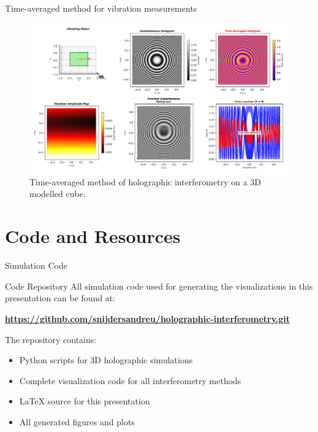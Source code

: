 \documentclass{beamer}
\begin{document}
\begin{frame}{Time-averaged method for vibration measurements}
    \begin{figure}[h]
        \centering
        \includegraphics[width=1\textwidth]{Figures/cube-vibration.png}
        \caption{Time-averaged method of holographic interferometry on a 3D modelled cube.}
        \label{fig:vibration_holography}
    \end{figure}
\end{frame}

\section{Code and Resources}
\begin{frame}{Simulation Code}
    \begin{alertblock}{Code Repository}
        All simulation code used for generating the visualizations in this presentation can be found at:
        
        \vspace{0.5em}
        
        \centering
        \textbf{\url{https://github.com/snijdersandreu/holographic-interferometry.git}}
        
        \vspace{0.5em}
        
        \raggedright
        The repository contains:
        \begin{itemize}
            \item Python scripts for 3D holographic simulations
            \item Complete visualization code for all interferometry methods
            \item LaTeX source for this presentation
            \item All generated figures and plots
        \end{itemize}
    \end{alertblock}
\end{frame}
\end{document}
